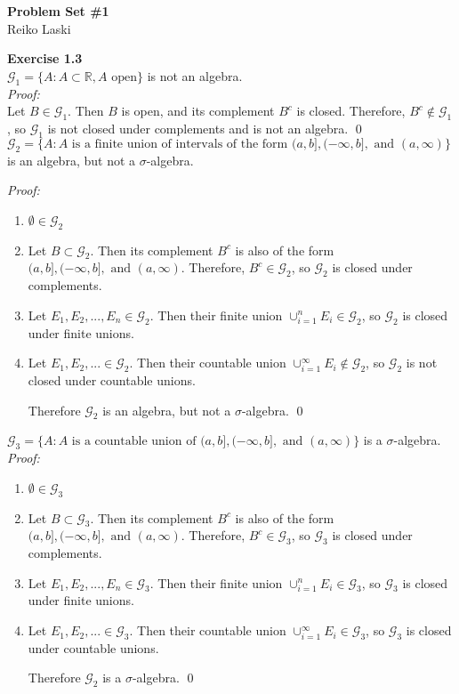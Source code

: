 \documentclass[letterpaper,12pt]{article}
\theoremstyle{definition}
\begin{document}
\begin{flushleft}
  \textbf{\large{Problem Set \#1}} \\
  Reiko Laski
\end{flushleft}

\vspace{3mm}

\textbf{Exercise 1.3} \\
$\mathcal{G}_1 = \{A: A \subset \mathbb{R}, A \text{ open}\} $ is not an algebra. \\
\textit{Proof:} \\
Let $B \in \mathcal{G}_1$. Then $B$ is open, and its complement $B^c$ is closed. Therefore, $B^c \not\in \mathcal{G}_1$, so $\mathcal{G}_1$ is not closed under complements and is not an algebra. \qed \\

$\mathcal{G}_2 = \{A: A \text{ is a finite union of intervals of the form } (a,b], (-\infty, b], \text{ and } (a, \infty) \}$ is an algebra, but not a $\sigma$-algebra.

\textit{Proof:}
\begin{enumerate}
\item $\emptyset \in \mathcal{G}_2$
\item Let $B \subset \mathcal{G}_2$. Then its complement $B^c$ is also of the form $(a,b], (-\infty, b], \text{ and } (a, \infty)$. Therefore, $B^c \in \mathcal{G}_2$, so $\mathcal{G}_2$ is closed under complements.
\item Let $E_1, E_2,...,E_n \in \mathcal{G}_2$. Then their finite union $\cup_{i=1}^n E_i \in \mathcal{G}_2$, so $\mathcal{G}_2$ is closed under finite unions.
\item Let $E_1, E_2,... \in \mathcal{G}_2$. Then their countable union $\cup_{i=1}^\infty E_i \not\in \mathcal{G}_2$, so $\mathcal{G}_2$ is not closed under countable unions.

Therefore $\mathcal{G}_2$ is an algebra, but not a $\sigma$-algebra. \qed
\end{enumerate}

$\mathcal{G}_3 = \{A: A \text{ is a countable union of } (a,b], (-\infty, b], \text{ and } (a, \infty) \}$ is a $\sigma$-algebra. \\
\textit{Proof:}
\begin{enumerate}

\item $\emptyset \in \mathcal{G}_3$
\item Let $B \subset \mathcal{G}_3$. Then its complement $B^c$ is also of the form $(a,b], (-\infty, b], \text{ and } (a, \infty)$. Therefore, $B^c \in \mathcal{G}_3$, so $\mathcal{G}_3$ is closed under complements.
\item Let $E_1, E_2,...,E_n \in \mathcal{G}_3$. Then their finite union $\cup_{i=1}^n E_i \in \mathcal{G}_3$, so $\mathcal{G}_3$ is closed under finite unions.
\item Let $E_1, E_2,... \in \mathcal{G}_3$. Then their countable union $\cup_{i=1}^\infty E_i \in \mathcal{G}_3$, so $\mathcal{G}_3$ is closed under countable unions.

Therefore $\mathcal{G}_2$ is a $\sigma$-algebra. \qed
\end{enumerate}
\end{document}
